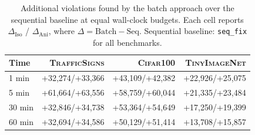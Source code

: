 \begin{table}[t]
\centering
\caption{Additional violations found by the batch approach over the sequential baseline at equal wall-clock budgets. Each cell reports $\Delta_{\mathrm{Iso}}$ / $\Delta_{\mathrm{Ani}}$, where $\Delta = \text{Batch} - \text{Seq}$. Sequential baseline: \texttt{seq\_fix} for all benchmarks.}
\label{tab:batch-advantage}
\small
\begin{tabular}{lrrr}
\toprule
\textbf{Time} & \textsc{TrafficSigns} & \textsc{Cifar100} & \textsc{TinyImageNet} \\
\midrule
1 min & +32,274/+33,366 & +43,109/+42,382 & +22,926/+25,075 \\
5 min & +61,664/+63,556 & +58,759/+60,044 & +21,335/+23,484 \\
30 min & +32,846/+34,738 & +53,364/+54,649 & +17,250/+19,399 \\
60 min & +32,694/+34,586 & +50,129/+51,414 & +13,708/+15,857 \\
\bottomrule
\end{tabular}
\end{table}
